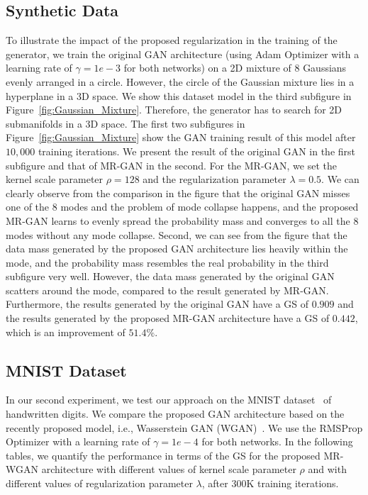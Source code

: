 \documentclass[10pt,twocolumn,letterpaper]{article}
\begin{document}
\subsection{Synthetic Data}
To illustrate the impact of the proposed regularization in the training of the generator, we train the original GAN architecture \cite{goodfellow2014generative} (using Adam Optimizer with a learning rate of $\gamma=1e-3$ for both networks) on a 2D mixture of $8$ Gaussians evenly arranged in a circle. However, the circle of the Gaussian mixture lies in a hyperplane in a 3D space. We show this dataset model in the third subfigure in Figure~\ref{fig:Gaussian_Mixture}. Therefore, the generator has to search for 2D submanifolds in a 3D space. The first two subfigures in Figure~\ref{fig:Gaussian_Mixture} show the GAN training result of this model after $10,000$ training iterations. We present the result of the original GAN in the first subfigure and that of MR-GAN in the second. For the MR-GAN, we set the kernel  scale parameter $\rho=128$ and the regularization parameter $\lambda=0.5$. We can clearly observe from the comparison in the figure that the original GAN misses one of the $8$ modes and the problem of mode collapse happens, and the proposed MR-GAN learns to evenly spread the probability mass and converges to all the $8$ modes without any mode collapse. Second, we can see from the figure that the data mass generated by the proposed GAN architecture lies heavily within the mode, and the probability mass resembles the real probability in the third subfigure very well. However, the data mass generated by the original GAN scatters around the mode, compared to the result generated by MR-GAN. Furthermore, the results generated by the original GAN have a GS of $0.909$ and the results generated by the proposed MR-GAN architecture have a GS of $0.442$, which is an improvement of $51.4\%$.

\subsection{MNIST Dataset}
In our second experiment, we test our approach on the {{MNIST dataset~\cite{mnist_data}}} of handwritten digits. We compare the proposed GAN architecture based on the recently proposed model, i.e., Wasserstein GAN (WGAN)~\cite{arjovsky2017wasserstein}. We use the RMSProp Optimizer with a learning rate of $\gamma=1e-4$ for both networks. In the following tables, we quantify the performance in terms of the GS for the proposed MR-WGAN architecture with different values of kernel scale parameter $\rho$ and with different values of regularization parameter $\lambda$, after 300K training iterations. 
\end{document}
